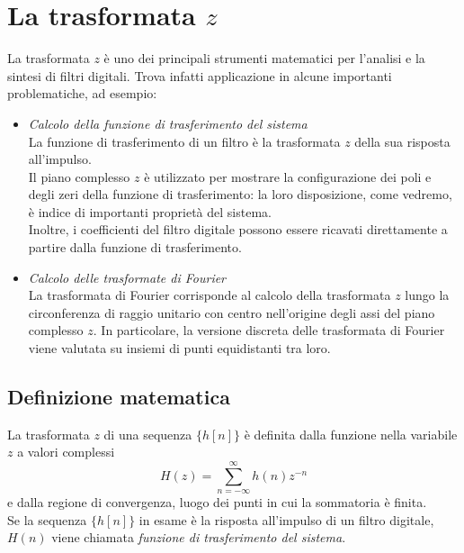                                                                            
%

\chapter{La trasformata $z$}
La trasformata $z$ \`e uno dei principali strumenti matematici per l'analisi e la sintesi di filtri digitali. Trova infatti applicazione in alcune importanti problematiche, ad esempio:
\begin{itemize}
\item \emph{Calcolo della funzione di trasferimento del sistema} \\
La funzione di trasferimento di un filtro \`e la trasformata $z$ della sua risposta all'impulso. \\
Il piano complesso $z$ \`e utilizzato per mostrare la configurazione dei poli e degli zeri della funzione di trasferimento: la loro disposizione, come vedremo, \`e indice di importanti propriet\`a del sistema.\\
Inoltre, i coefficienti del filtro digitale possono essere ricavati direttamente a partire dalla funzione di trasferimento.
\item \emph{Calcolo delle trasformate di Fourier} \\
La trasformata di Fourier corrisponde al calcolo della trasformata $z$ lungo la circonferenza di raggio unitario con centro nell'origine degli assi del piano complesso $z$. In particolare, la versione discreta delle trasformata di Fourier viene valutata su insiemi di punti equidistanti tra loro.
\end{itemize}
\section{Definizione matematica}
La trasformata $z$ di una sequenza $\{h[n]\}$ \`e definita dalla funzione nella variabile $z$ a valori complessi
\begin{displaymath}
H(z) = \sum_{n=-\infty}^\infty h(n)z^{-n}
\end{displaymath}
e dalla regione di convergenza, luogo dei punti in cui la sommatoria \`e finita. \\
Se la sequenza $\{h[n]\}$ in esame \`e la risposta all'impulso di un filtro digitale, $H(n)$ viene chiamata \emph{funzione di trasferimento del sistema}.
